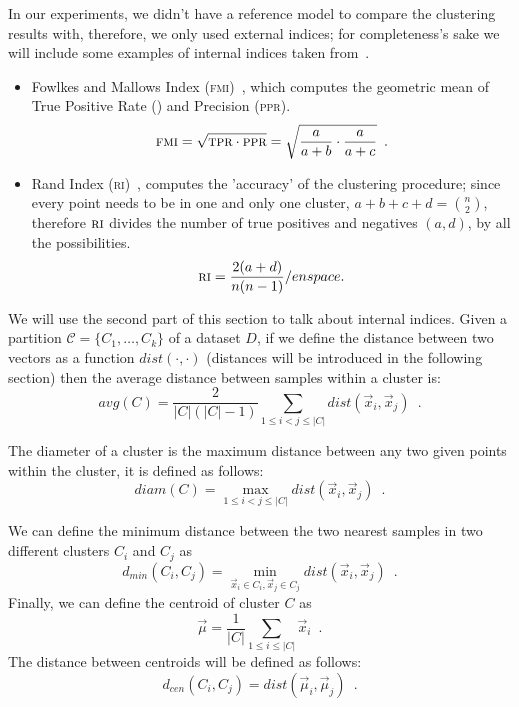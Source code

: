 In our experiments, we didn't have a reference model to compare the clustering results with,
therefore, we only used external indices; for completeness's sake we will include some examples of internal indices taken from~\cite{ZhouZhi-Hua2021ML}.

\begin{itemize}
	\item Fowlkes and Mallows Index (\textsc{fmi})~\cite{Fowlkes1983}, which computes the
		geometric mean of True Positive Rate (\tpr) and Precision (\textsc{ppr}).
		\begin{equation*}
			\textsc{fmi} = \sqrt{\textsc{tpr} \cdot \textsc{ppr}} = \sqrt{\frac{a}{a + b} \cdot
			\frac{a}{a + c}} \enspace.
		\end{equation*}
	\item Rand Index (\textsc{ri})~\cite{Rand1971}, computes the 'accuracy' of the clustering
		procedure; since every point needs to be in one and only one cluster, $a + b + c + d
		= \binom{n}{2}$, therefore $\textsc{ri}$ divides the number of true positives and
		negatives $(a, d)$, by all the possibilities.
		\begin{equation*}
			\textsc{ri} = \frac{2(a + d)}{n(n - 1)} /enspace.
		\end{equation*}
\end{itemize}

We will use the second part of this section to talk about internal indices. Given a partition
$\mathcal{C} = \{C_1, \ldots, C_k\}$ of a dataset $D$, if we define the distance between two vectors
as a function $dist(\cdot, \cdot)$ (distances will be introduced in the following section) then the
average distance between samples within a cluster is:
\begin{equation}
	\label{eq:cluster-avg}
	avg(C) = \frac{2}{|C|(|C| - 1)}\sum_{1 \leq i < j \leq |C|} dist(\vec{x}_i, \vec{x}_j)
	\enspace.
\end{equation}

The diameter of a cluster is the maximum distance between any two given points within the cluster,
it is defined as follows:
\begin{equation}
	\label{eq:cluster-diam}
	diam(C) = \max_{1 \leq i < j \leq |C|} dist(\vec{x}_i, \vec{x}_j) \enspace.
\end{equation}

We can define the minimum distance between the two nearest samples in two different clusters $C_i$
and $C_j$ as
\begin{equation}
	\label{eq:inter-cluster-distance}
	d_{min}(C_i, C_j) = \min_{\vec{x}_i \in C_i, \vec{x}_j \in C_j} dist(\vec{x}_i, \vec{x}_j)
	\enspace.
\end{equation}
Finally, we can define the centroid of cluster $C$ as
\begin{equation}
	\label{eq:centroid}
	\vec{\mu} = \frac{1}{|C|} \sum_{1 \leq i \leq |C|} \vec{x}_i
	\enspace.
\end{equation}
The distance between centroids will be defined as follows:
\begin{equation}
	\label{eq:cluster-centroid-distance}
	d_{cen}(C_i, C_j) = dist(\vec{\mu}_i, \vec{\mu}_j)
	\enspace.
\end{equation}

